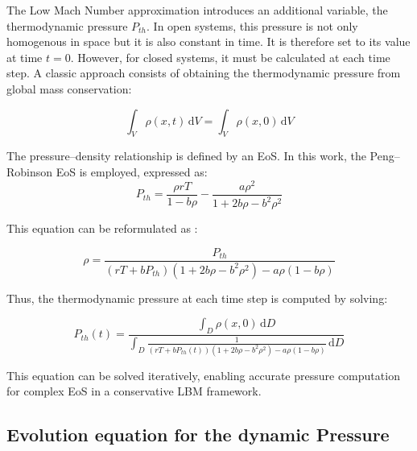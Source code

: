 The Low Mach Number approximation introduces an additional variable, the
thermodynamic pressure $P_{th}$. In open systems, this pressure is not only
homogenous in space but it is also constant in time. It is therefore set to its
value at time $t=0$. However, for closed systems, it must be calculated at each
time step. A classic approach consists of obtaining the thermodynamic pressure
from global mass conservation: 

\begin{equation}
    \int_V \rho(x,t) \, \mathrm{d}V = \int_V \rho(x,0) \, \mathrm{d}V
\end{equation}

The pressure–density relationship is defined by an EoS. In this work, the
Peng–Robinson EoS is employed, expressed as:
\begin{equation}
    P_{th} = \frac{\rho r T}{1 - b\rho} - \frac{a \rho^2}{1 + 2b\rho - b^2 \rho^2}
\end{equation}

This equation can be reformulated as :

\begin{equation}
    \rho = \frac{P_{th}}{(rT + b P_{th})(1 + 2b\rho - b^2 \rho^2) - a \rho(1 - b\rho)}
\end{equation}

Thus, the thermodynamic pressure at each time step is computed by solving:

\begin{equation}
    P_{th}(t) = \frac{\int_D \rho(x,0) \, \mathrm{d}D}{\int_D \frac{1}{(rT + b P_{th}(t))(1 + 2b\rho - b^2 \rho^2) - a\rho(1 - b\rho)} \, \mathrm{d}D}
\end{equation}

This equation can be solved iteratively, enabling accurate pressure computation
for complex EoS in a conservative LBM framework.


\subsection{Evolution equation for the dynamic Pressure}



